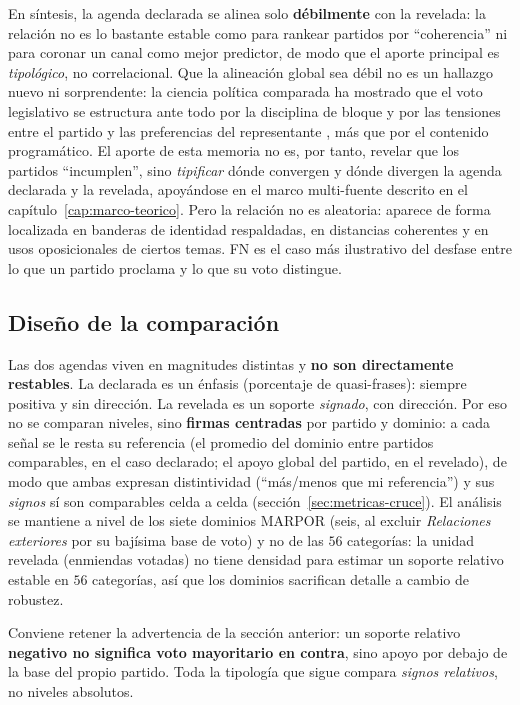 En síntesis, la agenda declarada se alinea solo \textbf{débilmente} con la
revelada: la relación no es lo bastante estable como para rankear partidos por
``coherencia'' ni para coronar un canal como mejor predictor, de modo que el
aporte principal es \emph{tipológico}, no correlacional. Que la alineación global
sea débil no es un hallazgo nuevo ni sorprendente: la ciencia política comparada
ha mostrado que el voto legislativo se estructura ante todo por la disciplina de
bloque \cite{sieberer2006partyunity} y por las tensiones entre el partido y las
preferencias del representante \cite{carey2007competing}, más que por el
contenido programático. El aporte de esta memoria no es, por tanto, revelar que los
partidos ``incumplen'', sino \emph{tipificar} dónde convergen y dónde divergen la
agenda declarada y la revelada, apoyándose en el marco multi-fuente descrito en el
capítulo~\ref{cap:marco-teorico}. Pero la relación no es aleatoria:
aparece de forma localizada en banderas de identidad respaldadas, en distancias
coherentes y en usos oposicionales de ciertos temas. FN es el caso más
ilustrativo del desfase entre lo que un partido proclama y lo que su voto
distingue.

\subsection{Diseño de la comparación}
\label{sec:res-cruce-diseno}

Las dos agendas viven en magnitudes distintas y \textbf{no son directamente
restables}. La declarada es un énfasis (porcentaje de quasi-frases): siempre
positiva y sin dirección. La revelada es un soporte \emph{signado}, con
dirección. Por eso no
se comparan niveles, sino \textbf{firmas centradas} por partido y dominio: a cada
señal se le resta su referencia (el promedio del dominio entre partidos
comparables, en el caso declarado; el apoyo global del partido, en el revelado),
de modo que ambas expresan distintividad (``más/menos que mi referencia'') y
sus \emph{signos} sí son comparables celda a celda
(sección~\ref{sec:metricas-cruce}). El análisis se mantiene a nivel de los siete
dominios MARPOR (seis, al excluir \emph{Relaciones exteriores} por su bajísima base
de voto) y no de las $56$ categorías: la unidad revelada (enmiendas votadas)
no tiene densidad para estimar un soporte relativo estable en $56$ categorías, así
que los dominios sacrifican detalle a cambio de robustez.

Conviene retener la advertencia de la sección anterior: un soporte relativo
\textbf{negativo no significa voto mayoritario en contra}, sino apoyo por debajo
de la base del propio partido. Toda la tipología que sigue compara \emph{signos
relativos}, no niveles absolutos.

